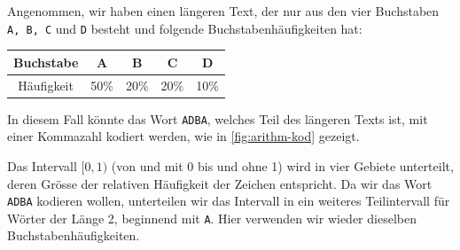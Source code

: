 \begin{myexample}
Angenommen, wir haben einen längeren Text, der nur aus den vier Buchstaben \texttt{A, B, C} und \texttt{D} besteht und folgende Buchstabenhäufigkeiten hat:
\begin{table}[H]
	\centering
	\begin{tabular}{c||c|c|c|c}
		Buchstabe  & A    & B    & C    & D    \\\midrule
		Häufigkeit & 50\% & 20\% & 20\% & 10\%
	\end{tabular}
\end{table}

In diesem Fall könnte das Wort \texttt{ADBA}, welches Teil des längeren Texts ist, mit einer Kommazahl kodiert werden, wie in \cref{fig:arithm-kod} gezeigt.

Das Intervall $[0, 1)$ (von und mit 0 bis und ohne 1) wird in vier Gebiete unterteilt, deren Grösse der relativen Häufigkeit der Zeichen entspricht. Da wir das Wort \texttt{ADBA} kodieren wollen, unterteilen wir das Intervall in ein weiteres Teilintervall für Wörter der Länge 2, beginnend mit \texttt{A}. Hier verwenden wir wieder dieselben Buchstabenhäufigkeiten.

\newcommand{\arithmeticTikz}[7]{
	\draw (0,#1) -- (10,#1);


	\foreach \i in {1,...,4}{
			\pgfmathsetmacro{\inc}{#2[\i-1]} %
			\pgfmathsetmacro{\xStart}{#3[\i-1]} %
			\pgfmathsetmacro{\xEnd}{\xStart+\inc} %
			\pgfmathsetmacro{\l}{#4[\i-1]} %

			\draw (\xStart*10,#1+0.2) to (\xStart*10,#1-0.2);
			\draw (\xEnd*10,#1+0.2) to (\xEnd*10,#1-0.2);

			\node (\l-Perc) at (\xStart*10,#1-0.4) {\fpeval{round(((1-\xStart)*#6+#7*\xStart),4)}};
			\node (\l-PercEnd) at (\xEnd*10,#1-0.4) {\fpeval{round(((1-\xEnd)*#6+#7*\xEnd),4)}};

}}
\end{myexample}
